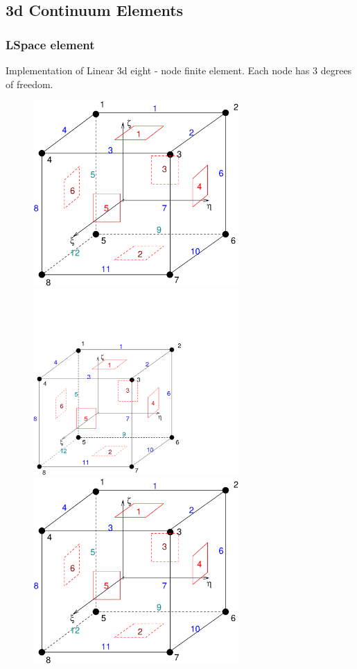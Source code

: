 \documentclass[a4paper]{article}
\begin{document}
\subsection{3d Continuum Elements}
\subsubsection{LSpace element}
\label{lspacesect}
Implementation of Linear 3d  eight - node 
finite element. Each node has 3 degrees of freedom.
\begin{figure}[tb]
\begin{htmlonly}
  \centerline{\includegraphics[width=0.7\textwidth]{hexa_lin.eps}}
\end{htmlonly}
\ifpdf
 \centerline{\includegraphics[width=0.7\textwidth]{hexa_lin.pdf}}
\else
 \centerline{\includegraphics[width=0.7\textwidth]{hexa_lin.eps}}

\end{figure}
\end{document}

